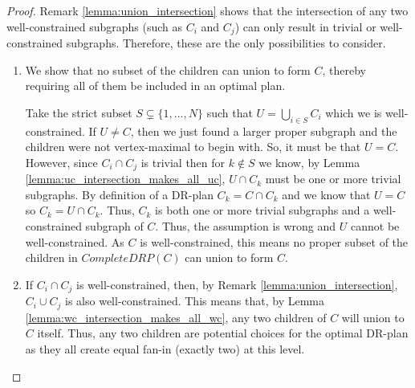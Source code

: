 \begin{proof}
Remark \ref{lemma:union_intersection} shows that the intersection of any two well-constrained subgraphs (such as $C_i$ and $C_j$) can only result in trivial or well-constrained subgraphs. Therefore, these are the only possibilities to consider.

\begin{enumerate}
\item
We show that no subset of the children can union to form $C$, thereby requiring all of them be included in an optimal plan.

Take the strict subset $S\subsetneq \{1,\ldots,N\}$ such that $U=\bigcup_{i\in S}{C_i}$ which we  is well-constrained. If $U\neq C$, then we just found a larger proper subgraph and the children were not vertex-maximal to begin with. So, it must be that $U=C$.
\usestwod
However, since $C_i \cap C_j$ is trivial then for $k\notin S$ we know, by Lemma \ref{lemma:uc_intersection_makes_all_uc}, $U\cap C_k$ must be one or more trivial subgraphs. By definition of a DR-plan $C_k=C\cap C_k$ and we know that $U=C$ so $C_k=U\cap C_k$. Thus, $C_k$ is both one or more trivial subgraphs and a well-constrained subgraph of $C$. Thus, the assumption is wrong and $U$ cannot be well-constrained. As $C$ is well-constrained, this means no proper subset of the children in $CompleteDRP(C)$ can union to form $C$.


\item
If $C_i \cap C_j$ is well-constrained, then, by Remark \ref{lemma:union_intersection}, $C_i \cup C_j$ is also well-constrained. This means that, by Lemma \ref{lemma:wc_intersection_makes_all_wc}, any two children of $C$ will union to $C$ itself. Thus, any two children are potential choices for the optimal DR-plan as they all create equal fan-in (exactly two) at this level.


\end{enumerate}
\end{proof}
